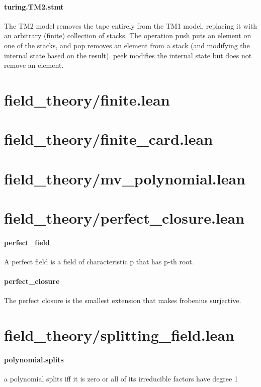 \documentclass{article}
\begin{document}
\paragraph{turing.TM2.stmt}
\par
The TM2 model removes the tape entirely from the TM1 model,
replacing it with an arbitrary (finite) collection of stacks.
The operation 
\colorbox[RGB]{253,246,227}{{{{\color[RGB]{101, 123, 131} push }}}} puts an element on one of the stacks,
and 
\colorbox[RGB]{253,246,227}{{{{\color[RGB]{101, 123, 131} pop }}}} removes an element from a stack (and modifying the
internal state based on the result). 
\colorbox[RGB]{253,246,227}{{{{\color[RGB]{101, 123, 131} peek }}}} modifies the
internal state but does not remove an element.
\section{field\_theory/finite.lean}\section{field\_theory/finite\_card.lean}\section{field\_theory/mv\_polynomial.lean}\section{field\_theory/perfect\_closure.lean}\paragraph{perfect\_field}
\par
A perfect field is a field of characteristic p that has p-th root.
\paragraph{perfect\_closure}
\par
The perfect closure is the smallest extension that makes frobenius surjective.
\section{field\_theory/splitting\_field.lean}\paragraph{polynomial.splits}
\par
a polynomial 
\colorbox[RGB]{253,246,227}{{{{\color[RGB]{101, 123, 131} splits }}}} iff it is zero or all of its irreducible factors have 
\colorbox[RGB]{253,246,227}{{{{\color[RGB]{101, 123, 131} degree }}}} 1
\end{document}
